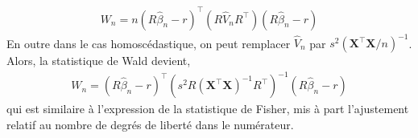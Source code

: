 \documentclass[12pt, reqno]{amsart}
\begin{document}
\begin{align*}
W_n = n\left(R\widehat{\beta}_n - r\right)^\top\left(R\widehat{V}_nR^\top\right)\left(R\widehat{\beta}_n - r\right)
\end{align*}
En outre dans le cas homoscédastique, on peut remplacer $\widehat{V}_n$ par $s^2(\mathbf{X}^\top\mathbf{X}/n)^{-1}$. Alors, la statistique de Wald devient,
\begin{align*}
W_n = \left(R\widehat{\beta}_n - r\right)^\top\left(s^2R(\mathbf{X}^\top\mathbf{X})^{-1}R^\top\right)^{-1}\left(R\widehat{\beta}_n-r\right)
\end{align*}
qui est similaire à l'expression de la statistique de Fisher, mis à part l'ajustement relatif au nombre de degrés de liberté dans le numérateur.


\appendix
\end{document}
